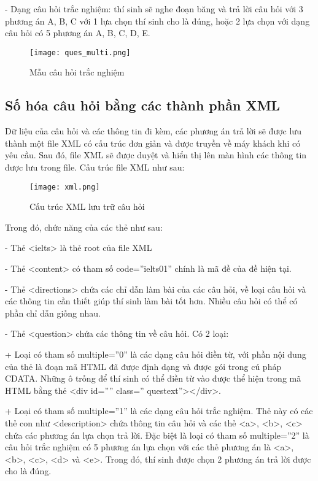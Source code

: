 \quad - Dạng câu hỏi trắc nghiệm: thí sinh sẽ nghe đoạn băng và trả lời câu hỏi với 3 phương án A, B, C với 1 lựa chọn thí sinh cho là đúng, hoặc 2 lựa chọn với dạng câu hỏi có 5 phương án A, B, C, D, E.

\begin{figure}[!htb] 
\centering
\texttt{[image: ques\_multi.png]}
\caption{Mẫu câu hỏi trắc nghiệm}
\end{figure}

\subsection{Số hóa câu hỏi bằng các thành phần XML}

Dữ liệu của câu hỏi và các thông tin đi kèm, các phương án trả lời sẽ được lưu thành một file XML có cấu trúc đơn giản và được truyền về máy khách khi có yêu cầu. Sau đó, file XML sẽ được duyệt và hiển thị lên màn hình các thông tin được lưu trong file. Cấu trúc file XML như sau:

\begin{figure}[!htb] 
\centering
\texttt{[image: xml.png]}
\caption{Cấu trúc XML lưu trữ câu hỏi}
\end{figure}

Trong đó, chức năng của các thẻ như sau:

\quad - Thẻ <ielts> là thẻ root của file XML

\quad - Thẻ <content> có tham số code=”ielts01” chính là mã đề của đề hiện tại.

\quad - Thẻ <directions> chứa các chỉ dẫn làm bài của các câu hỏi, về loại câu hỏi và các thông tin cần thiết giúp thí sinh làm bài tốt hơn. Nhiều câu hỏi có thể có phần chỉ dẫn giống nhau.

\quad - Thẻ <question> chứa các thông tin về câu hỏi. Có 2 loại:

\quad \quad + Loại có tham số multiple=”0” là các dạng câu hỏi điền từ, với phần nội dung của thẻ là đoạn mã HTML đã được định dạng và được gói trong cú pháp CDATA. Những ô trống để thí sinh có thể điền từ vào được thể hiện trong mã HTML bằng thẻ <div id=”” class=” questext”></div>.

\quad \quad + Loại có tham số multiple=”1” là các dạng câu hỏi trắc nghiệm. Thẻ này có các thẻ con như <description> chứa thông tin câu hỏi và các thẻ <a>, <b>, <c> chứa các phương án lựa chọn trả lời. Đặc biệt là loại có tham số multiple=”2” là câu hỏi trắc nghiệm có 5 phương án lựa chọn với các thẻ phương án là <a>, <b>, <c>, <d> và <e>. Trong đó, thí sinh được chọn 2 phương án trả lời được cho là đúng.





